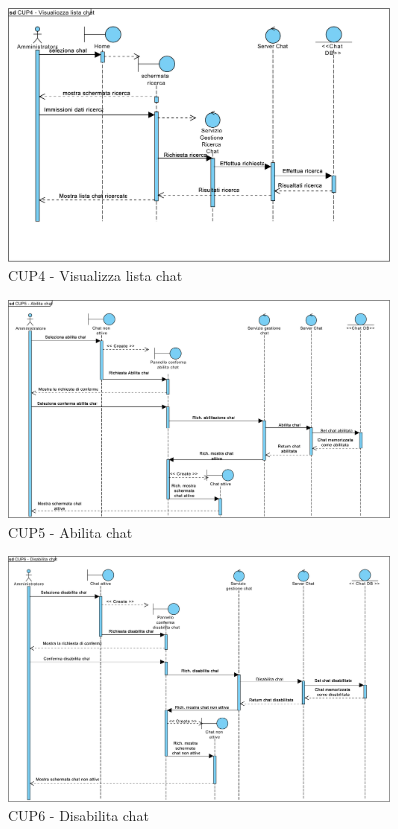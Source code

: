 \begin{figure}
	\centering
	\includegraphics[width=0.9\textwidth]{imgs/gruppo6/sequence/CUP4_visualizza_lista_chat.pdf}
	\caption{CUP4 - Visualizza lista chat}
	\label{fig:seq-cup4}
\end{figure}

\begin{figure}
	\centering
	\includegraphics[width=0.9\textwidth]{imgs/gruppo6/sequence/CUP5_abilita_chat.pdf}
	\caption{CUP5 - Abilita chat}
	\label{fig:seq-cup5}
\end{figure}

\begin{figure}
	\centering
	\includegraphics[width=0.9\textwidth]{imgs/gruppo6/sequence/CUP6_disabilita_chat.pdf}
	\caption{CUP6 - Disabilita chat}
	\label{fig:seq-cup6}
\end{figure}

